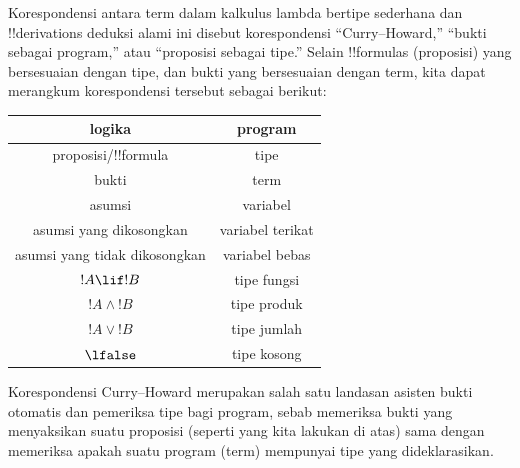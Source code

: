 \documentclass[../../../include/open-logic-section]{subfiles}
\begin{document}
Korespondensi antara term dalam kalkulus lambda bertipe sederhana dan
!!{derivation}s deduksi alami ini disebut korespondensi ``Curry--Howard,''
``bukti sebagai program,'' atau ``proposisi sebagai tipe.'' Selain
!!{formula}s (proposisi) yang bersesuaian dengan tipe, dan bukti yang
bersesuaian dengan term, kita dapat merangkum korespondensi tersebut
sebagai berikut:
\begin{center}
  \begin{tabular}{c c}
    logika & program \\
    \hline
    proposisi/!!{formula} & tipe \\
    bukti & term \\
    asumsi & variabel \\
    asumsi yang dikosongkan & variabel terikat \\
    asumsi yang tidak dikosongkan & variabel bebas \\
    $!A \lif !B$ & tipe fungsi \\
    $!A \land !B$ & tipe produk \\
    $!A \lor !B$ & tipe jumlah \\
    $\lfalse$ & tipe kosong \\
    \hline
  \end{tabular}
\end{center}

Korespondensi Curry--Howard merupakan salah satu landasan asisten bukti
otomatis dan pemeriksa tipe bagi program, sebab memeriksa bukti yang
menyaksikan suatu proposisi (seperti yang kita lakukan di atas) sama
dengan memeriksa apakah suatu program (term) mempunyai tipe yang
dideklarasikan.
\end{document}
